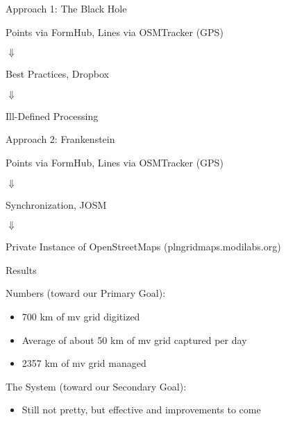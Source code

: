\documentclass{beamer}
\begin{document}
\begin{frame}{Approach 1: The Black Hole}
  \begin{center}


  Points via FormHub, Lines via OSMTracker (GPS)
  
  $\Downarrow$ 
  
  Best Practices, Dropbox 
  
  $\Downarrow$ 
  
  Ill-Defined Processing 
  \end{center}

\end{frame}

\begin{frame}{Approach 2: Frankenstein}
  \begin{center}


  Points via FormHub, Lines via OSMTracker (GPS)
  
  $\Downarrow$ 
  
  Synchronization, JOSM 
  
  $\Downarrow$ 
  
  Private Instance of OpenStreetMaps (plngridmaps.modilabs.org)
  \end{center}

\end{frame}

\begin{frame}{Results}


  Numbers (toward our Primary Goal):
  \begin{itemize}
  \item[] 700 km of mv grid digitized
  \item[] Average of about 50 km of mv grid captured per day
  \item[] 2357 km of mv grid managed 
  \end{itemize}
  
  \bigskip 

  The System (toward our Secondary Goal):
  \begin{itemize}
  \item[] Still not pretty, but effective and improvements to come
  \end{itemize}
  
\end{frame}
\end{document}
